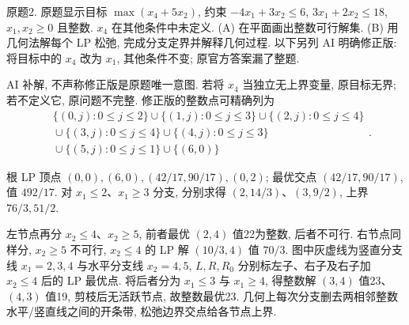 \begin{exercise}\label{ass:15053-rec7-q2}
原题2. 原题显示目标 $\max(x_4+5x_2)$, 约束 $-4x_1+3x_2\le6$, $3x_1+2x_2\le18$, $x_1,x_2\ge0$ 且整数. $x_4$ 在其他条件中未定义.
(A) 在平面画出整数可行解集. (B) 用几何法解每个 LP 松弛, 完成分支定界并解释几何过程. 以下另列 AI 明确修正版: 将目标中的 $x_4$ 改为 $x_1$, 其他条件不变; 原官方答案漏了整题.
\end{exercise}
\begin{solution}
AI 补解, 不声称修正版是原题唯一意图. 若将 $x_4$ 当独立无上界变量, 原目标无界; 若不定义它, 原问题不完整. 修正版的整数点可精确列为
\[
\begin{aligned}
&\{(0,j):0\le j\le2\}\cup\{(1,j):0\le j\le3\}\cup\{(2,j):0\le j\le4\}\\
&{}\cup\{(3,j):0\le j\le4\}\cup\{(4,j):0\le j\le3\}\\
&{}\cup\{(5,j):0\le j\le1\}\cup\{(6,0)\}
\end{aligned}.
\]
\begin{center}\end{center}
根 LP 顶点 $(0,0),(6,0),(42/17,90/17),(0,2)$; 最优交点 $(42/17,90/17)$, 值 $492/17$. 对 $x_1\le2$、$x_1\ge3$ 分支, 分别求得 $(2,14/3)$、$(3,9/2)$, 上界 $76/3,51/2$.

左节点再分 $x_2\le4$、$x_2\ge5$, 前者最优 $(2,4)$ 值22为整数, 后者不可行. 右节点同样分, $x_2\ge5$ 不可行, $x_2\le4$ 的 LP 解 $(10/3,4)$ 值 $70/3$. 图中灰虚线为竖直分支线 $x_1=2,3,4$ 与水平分支线 $x_2=4,5$, $L,R,R_0$ 分别标左子、右子及右子加 $x_2\le4$ 后的 LP 最优点. 将后者分为 $x_1\le3$ 与 $x_1\ge4$, 得整数解 $(3,4)$ 值23、$(4,3)$ 值19, 剪枝后无活跃节点, 故整数最优23. 几何上每次分支删去两相邻整数水平/竖直线之间的开条带, 松弛边界交点给各节点上界.
\end{solution}

